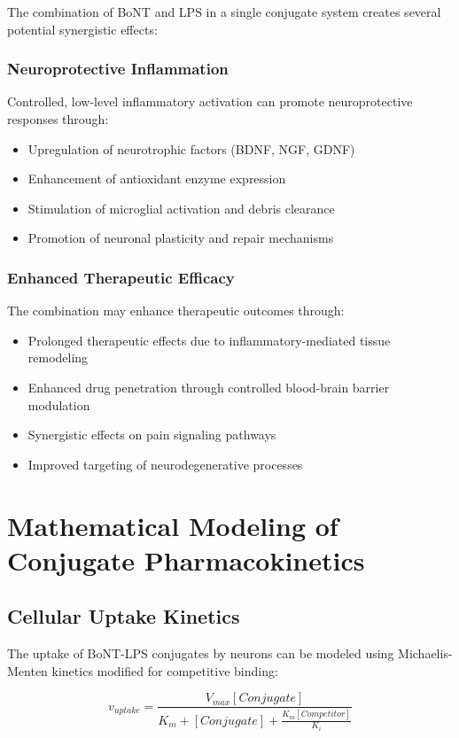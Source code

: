\documentclass[11pt,a4paper]{article}
\begin{document}
The combination of BoNT and LPS in a single conjugate system creates several potential synergistic effects:

\subsubsection{Neuroprotective Inflammation}

Controlled, low-level inflammatory activation can promote neuroprotective responses through:
\begin{itemize}
\item Upregulation of neurotrophic factors (BDNF, NGF, GDNF)
\item Enhancement of antioxidant enzyme expression
\item Stimulation of microglial activation and debris clearance
\item Promotion of neuronal plasticity and repair mechanisms
\end{itemize}

\subsubsection{Enhanced Therapeutic Efficacy}

The combination may enhance therapeutic outcomes through:
\begin{itemize}
\item Prolonged therapeutic effects due to inflammatory-mediated tissue remodeling
\item Enhanced drug penetration through controlled blood-brain barrier modulation
\item Synergistic effects on pain signaling pathways
\item Improved targeting of neurodegenerative processes
\end{itemize}

\section{Mathematical Modeling of Conjugate Pharmacokinetics}

\subsection{Cellular Uptake Kinetics}

The uptake of BoNT-LPS conjugates by neurons can be modeled using Michaelis-Menten kinetics modified for competitive binding:

\begin{equation}
v_{uptake} = \frac{V_{max}[Conjugate]}{K_m + [Conjugate] + \frac{K_m[Competitor]}{K_i}}
\end{equation}
\end{document}

